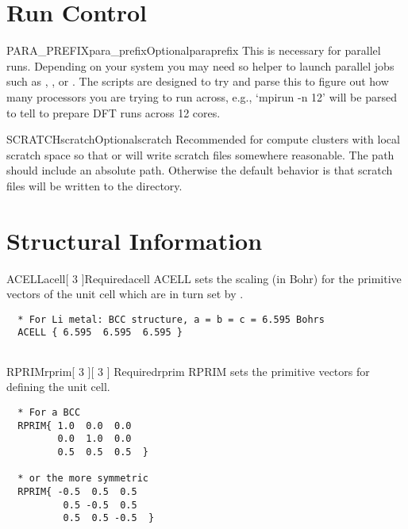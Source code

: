 \documentclass[11pt]{report}
\begin{document}
\section{Run Control}
\label{sec:Run-Control}

\begin{Card}{PARA\_PREFIX}{para\_prefix}{Optional}{paraprefix}
This is necessary for parallel runs. Depending on your system you may need so helper to launch parallel jobs such as , 
, or . The \OCEAN{} scripts are designed to try and parse this to figure out how many processors 
you are trying to run across, e.g., `mpirun -n 12' will be parsed to tell \OCEAN{} to prepare DFT runs across 12 cores. 
\end{Card}

\begin{Card}{SCRATCH}{scratch}{Optional}{scratch}
Recommended for compute clusters with local scratch space so that  or  
will write scratch files somewhere reasonable. The path  should include an absolute path. Otherwise the default 
behavior is that scratch files will be written to the  directory. 
\end{Card}



\section{Structural Information}
\label{sec:Structural-Information}



\begin{Card}{ACELL}{acell[ 3 ]}{Required}{acell}
  ACELL sets the scaling (in Bohr) for the primitive vectors of the unit cell which are in turn set by .

\begin{verbatim}
  * For Li metal: BCC structure, a = b = c = 6.595 Bohrs
  ACELL { 6.595  6.595  6.595 }
  
  \end{verbatim}
\end{Card}

\begin{Card}{RPRIM}{rprim[ 3 ][ 3 ] }{Required}{rprim}
  RPRIM sets the primitive vectors for defining the unit cell. 
  
  \begin{verbatim}
  * For a BCC
  RPRIM{ 1.0  0.0  0.0
         0.0  1.0  0.0
         0.5  0.5  0.5  }
  
  * or the more symmetric
  RPRIM{ -0.5  0.5  0.5
          0.5 -0.5  0.5
          0.5  0.5 -0.5  }
         
  \end{verbatim}
\end{Card}
\end{document}

